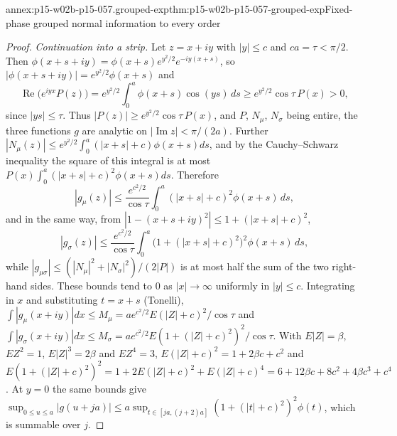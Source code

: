 \begin{annexitem}{annex:p15-w02b-p15-057.grouped-exp}{thm:p15-w02b-p15-057-grouped-exp}{Fixed-phase grouped normal information to every order}
\begin{proof}
\emph{Continuation into a strip.} Let \(z=x+iy\) with \(|y|\leq c\) and
\(ca=\tau<\pi/2\). Then
\(\phi(x+s+iy)=\phi(x+s)e^{y^2/2}e^{-iy(x+s)}\), so
\(|\phi(x+s+iy)|=e^{y^2/2}\phi(x+s)\) and
\[
 \operatorname{Re}\bigl(e^{iyx}P(z)\bigr)
 =e^{y^2/2}\int_0^a\phi(x+s)\cos(ys)\,ds\geq e^{y^2/2}\cos\tau\,P(x)>0,
\]
since \(|ys|\leq\tau\). Thus \(|P(z)|\geq e^{y^2/2}\cos\tau\,P(x)\), and
\(P\), \(N_\mu\), \(N_\sigma\) being entire, the three functions \(g\) are
analytic on \(|\operatorname{Im}z|<\pi/(2a)\). Further
\(|N_\mu(z)|\leq e^{y^2/2}\int_0^a(|x+s|+c)\phi(x+s)ds\), and by the
Cauchy--Schwarz inequality the square of this integral is at most
\(P(x)\int_0^a(|x+s|+c)^2\phi(x+s)ds\). Therefore
\[
 |g_\mu(z)|\leq\frac{e^{c^2/2}}{\cos\tau}\int_0^a(|x+s|+c)^2\phi(x+s)\,ds,
\]
and in the same way, from \(|1-(x+s+iy)^2|\leq1+(|x+s|+c)^2\),
\[
 |g_\sigma(z)|\leq\frac{e^{c^2/2}}{\cos\tau}\int_0^a\bigl(1+(|x+s|+c)^2\bigr)^2
 \phi(x+s)\,ds,
\]
while \(|g_{\mu\sigma}|\leq(|N_\mu|^2+|N_\sigma|^2)/(2|P|)\) is at most half
the sum of the two right-hand sides. These bounds tend to \(0\) as
\(|x|\to\infty\) uniformly in \(|y|\leq c\). Integrating in \(x\) and
substituting \(t=x+s\) (Tonelli),
\(\int|g_\mu(x+iy)|dx\leq M_\mu=ae^{c^2/2}E(|Z|+c)^2/\cos\tau\) and
\(\int|g_\sigma(x+iy)|dx\leq M_\sigma=ae^{c^2/2}E(1+(|Z|+c)^2)^2/\cos\tau\).
With \(E|Z|=\beta\), \(EZ^2=1\), \(E|Z|^3=2\beta\) and \(EZ^4=3\),
\(E(|Z|+c)^2=1+2\beta c+c^2\) and
\(E(1+(|Z|+c)^2)^2=1+2E(|Z|+c)^2+E(|Z|+c)^4=6+12\beta c+8c^2+4\beta c^3+c^4\).
At \(y=0\) the same bounds give
\(\sup_{0\leq u\leq a}|g(u+ja)|\leq a\sup_{t\in[ja,(j+2)a]}(1+(|t|+c)^2)^2\phi(t)\),
which is summable over \(j\).


\end{proof}
\end{annexitem}
